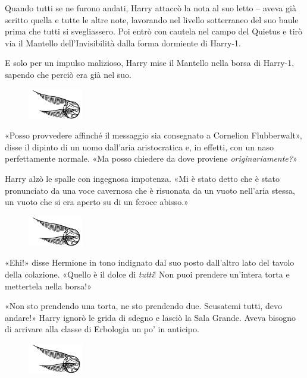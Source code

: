 Quando tutti se ne furono andati, Harry attaccò la nota al suo letto – aveva già scritto quella e tutte le altre note, lavorando nel livello sotterraneo del suo baule prima che tutti si svegliassero. Poi entrò con cautela nel campo del Quietus e tirò via il Mantello dell’Invisibilità dalla forma dormiente di Harry-1.

E solo per un impulso malizioso, Harry mise il Mantello nella borsa di Harry-1, sapendo che perciò era già nel suo.

\begin{figure}[h!]
        \includegraphics[scale=0.4]{boccino.png}
        \centering
\end{figure}

«Posso provvedere affinché il messaggio sia consegnato a Cornelion Flubberwalt», disse il dipinto di un uomo dall’aria aristocratica e, in effetti, con un naso perfettamente normale. «Ma posso chiedere da dove proviene \textit{originariamente?}»

Harry alzò le spalle con ingegnosa impotenza. «Mi è stato detto che è stato pronunciato da una voce cavernosa che è risuonata da un vuoto nell’aria stessa, un vuoto che si era aperto su di un feroce abisso.»

\begin{figure}[h!]
        \includegraphics[scale=0.4]{boccino.png}
        \centering
\end{figure}

«Ehi!» disse Hermione in tono indignato dal suo posto dall’altro lato del tavolo della colazione. «Quello è il dolce di \textit{tutti}! Non puoi prendere un’intera torta e mettertela nella borsa!»

«Non sto prendendo una torta, ne sto prendendo due. Scusatemi tutti, devo andare!» Harry ignorò le grida di sdegno e lasciò la Sala Grande. Aveva bisogno di arrivare alla classe di Erbologia un po’ in anticipo.

\begin{figure}[h!]
        \includegraphics[scale=0.4]{boccino.png}
        \centering
\end{figure}

